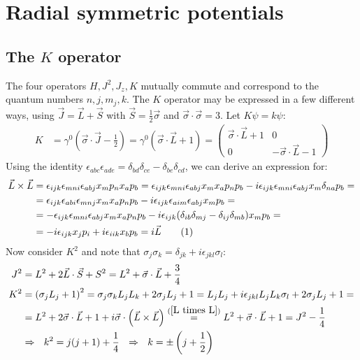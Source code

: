\documentclass[a4paper,12pt]{article}
\newcommand\numberthis{\addtocounter{equation}{1}\tag{\theequation}}
\newcommand{\kla}{}
\begin{document}
\section{Radial symmetric potentials}
\subsection{The $K$ operator}
The four operators $H,J^2,J_z,K$ mutually commute and correspond to the quantum numbers $n,j,m_j,k$. The $K$ operator may be expressed in a few different ways, using $\vec{J}=\vec{L}+\vec{S}$ with $\vec{S}=\frac{1}{2}\vec{\sigma}$ and $\vec{\sigma}\cdot\vec{\sigma}=3$. Let $K\psi=k\psi$:
\begin{align*}
K&=\gamma^0\left(\vec{\sigma}\cdot\vec{J}-\frac{1}{2}\right)=\gamma^0\kla\left( {\vec{\sigma}\cdot\vec{L}+1} \right)=\begin{pmatrix}
\vec{\sigma}\cdot\vec{L}+1 & 0\\ 0 & -\vec{\sigma}\cdot\vec{L}-1
\end{pmatrix}
\end{align*}
Using the identity $\epsilon_{abc}\epsilon_{ade}=\delta_{bd}\delta_{ce}-\delta_{be}\delta_{cd}$, we can derive an expression for:
\begin{align*}
\vec{L}\times\vec{L}&=\epsilon_{ijk}\epsilon_{mni}\epsilon_{abj}  x_mp_nx_ap_b=\epsilon_{ijk}\epsilon_{mni}\epsilon_{abj}x_mx_ap_np_b-i\epsilon_{ijk}\epsilon_{mni}\epsilon_{abj}x_m\delta_{na}p_b=\\
&=\epsilon_{ijk}\epsilon_{abi}\epsilon_{mnj}x_mx_ap_np_b-i\epsilon_{ijk}\epsilon_{aim}\epsilon_{abj}x_mp_b=\\
&=-\epsilon_{ijk}\epsilon_{mni}\epsilon_{abj}x_mx_ap_np_b-i\epsilon_{ijk}(\delta_{ib}\delta_{mj}-\delta_{ij}\delta_{mb})x_mp_b=\\
&=-i\epsilon_{ijk}x_jp_i+i\epsilon_{iik}x_bp_b=i\vec{L}\numberthis\label{L times L}
\end{align*}
Now consider $K^2$ and note that $\sigma_j\sigma_k=\delta_{jk}+i\epsilon_{jkl}\sigma_l$:
\begin{align*}
J^2&=L^2+2\vec{L}\cdot\vec{S}+S^2=L^2+\vec{\sigma}\cdot\vec{L}+\frac{3}{4}\\
K^2&=\kla\left( {\sigma_jL_j+1} \right)^2=\sigma_j\sigma_kL_jL_k+2\sigma_jL_j+1=L_jL_j+i\epsilon_{jkl}L_jL_k\sigma_l+2\sigma_jL_j+1=\\
&=L^2+2\vec{\sigma}\cdot\vec{L}+1+i\vec{\sigma}\cdot\kla\left( {\vec{L}\times\vec{L}} \right)\overset{(\ref{L times L})}{=}L^2+\vec{\sigma}\cdot\vec{L}+1=J^2-\frac{1}{4}\\
&\Rightarrow\ \ k^2=j(j+1)+\frac{1}{4}\ \ \Rightarrow\ \ k=\pm\kla\left( {j+\frac{1}{2}} \right)
\end{align*}
\end{document}
